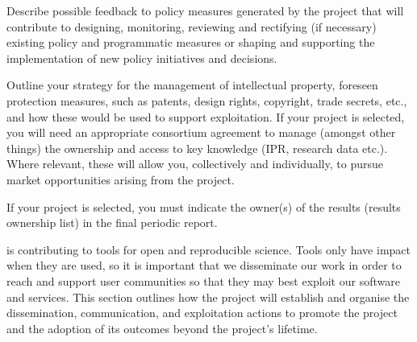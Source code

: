 \begin{draft}
Describe possible feedback to policy measures generated by the project that will
contribute to designing, monitoring, reviewing and rectifying (if necessary)
existing policy and programmatic measures or shaping and supporting the
implementation of new policy initiatives and decisions.
\begin{compactitem}
\item	Outline your strategy for the management of intellectual property, foreseen protection measures, such as patents, design rights, copyright, trade secrets, etc., and how these would be used to support exploitation.
	If your project is selected, you will need an appropriate consortium agreement
  to manage (amongst other things) the ownership and access to key knowledge
  (IPR, research data etc.). Where relevant, these will allow you, collectively
  and individually, to pursue market opportunities arising from the project.
\item If your project is selected, you must indicate the owner(s) of the results (results ownership list) in the final periodic report.
\end{compactitem}
\end{draft}


\TheProject is contributing to tools for open and reproducible science.
Tools only have impact when they are used,
so it is important that we disseminate our work
in order to reach and support user communities so that they may best exploit our software and services. This section
outlines how the project will establish and organise the dissemination, communication, and exploitation
actions to promote the project and the adoption of its outcomes beyond the project's lifetime.



